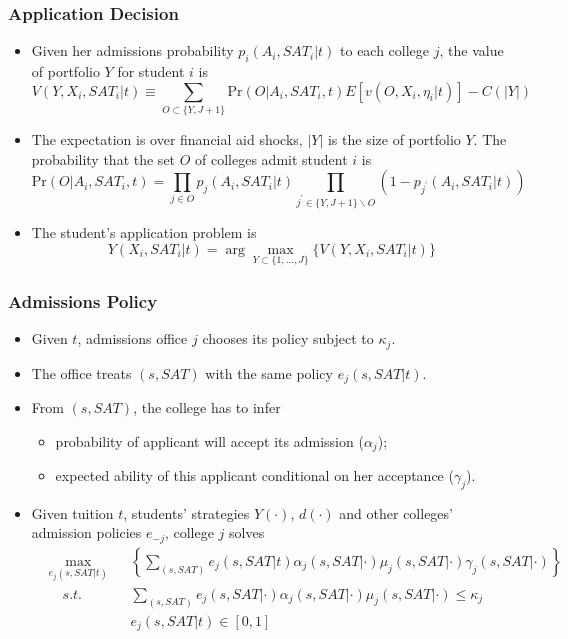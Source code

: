 \documentclass[10pt]{beamer}
\begin{document}
\begin{frame}[c]\frametitle{Application Decision}
\begin{itemize}
    \item Given her admissions probability $p_{i}(A_{i}, SAT_{i}|t)$ to each college $j$, the value of portfolio $Y$ for student $i$ is
\begin{equation}
    V(Y,X_{i},SAT_{i}|t) \equiv \sum_{O\subset \{Y,J+1\}} \textrm{Pr}(O|A_{i},SAT_{i},t) E[v(O,X_{i},\eta_{i}|t)] - C(|Y|)
\end{equation}
    \item The expectation is over financial aid shocks, $|Y|$ is the size of portfolio $Y$. The probability that the set $O$ of colleges admit student $i$ is
\begin{equation*}
    \textrm{Pr}(O|A_{i},SAT_{i},t) = \prod_{j\in O} p_{j}(A_{i},SAT_{i}|t) \prod_{j^{\prime}\in \{Y,J+1\}\backslash O}(1-p_{j^{\prime}}(A_{i},SAT_{i}|t))
\end{equation*}
    \item The student's application problem is
\begin{equation}\label{eq:sap}
    Y(X_{i},SAT_{i}|t) = \arg\max_{Y\subset\{1,\ldots,J\}} \big\{V(Y,X_{i},SAT_{i}|t)\big\}
\end{equation}

\end{itemize}
\end{frame}

\begin{frame}[c]\frametitle{Admissions Policy}

\begin{itemize}
    \item Given $t$, admissions office $j$ chooses its policy subject to $\kappa_{j}$.
    \item The office treats $(s,SAT)$ with the same policy $e_{j}(s,SAT|t)$.
    \item  From $(s,SAT)$, the college has to infer
    \begin{itemize}
        \item  probability of applicant will accept its admission ($\alpha_{j}$);
        \item  expected ability of this applicant conditional on her acceptance ($\gamma_{j}$).
    \end{itemize}
    \item Given tuition $t$, students' strategies $Y(\cdot)$, $d(\cdot)$ and other colleges' admission policies $e_{-j}$, college $j$ solves
    \begin{equation*}
    \begin{aligned}
    & \max _{e_{j}(s,SAT|t)} & & \left\{\sum_{(s,SAT)}e_{j}(s,SAT|t)\alpha_{j}(s,SAT|\cdot)\mu_{j}(s,SAT|\cdot)\gamma_{j}(s,SAT|\cdot)\right\} \\
    & \quad \textit{s.t.}  & & \sum_{(s,SAT)}e_{j}(s,SAT|\cdot)\alpha_{j}(s,SAT|\cdot)\mu_{j}(s,SAT|\cdot) \leq \kappa_{j}\\
    & \quad   & & e_{j}(s,SAT|t) \in [0,1]
    \end{aligned}
    \end{equation*}
\end{itemize}
\end{frame}
\end{document}
